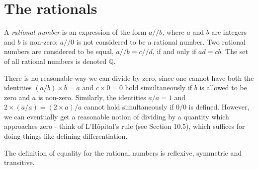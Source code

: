 \section{The rationals}

\begin{definition}\label{4.2.1}
A \emph{rational number} is an expression of the form \(a // b\), where \(a\) and \(b\) are integers and \(b\) is non-zero;
\(a // 0\) is not considered to be a rational number.
Two rational numbers are considered to be equal, \(a // b = c // d\), if and only if \(ad = cb\).
The set of all rational numbers is denoted \(\mathds{Q}\).
\end{definition}

\begin{note}
There is no reasonable way we can divide by zero, since one cannot have both the identities \((a / b) \times b = a\) and \(c \times 0 = 0\) hold simultaneously if \(b\) is allowed to be zero and \(a\) is non-zero.
Similarly, the identities \(a / a = 1\) and \(2 \times (a / a) = (2 \times a) / a\) cannot hold simultaneously if \(0 / 0\) is defined.
However, we can eventually get a reasonable notion of dividing by a quantity which approaches zero
- think of L'H\^opital's rule (see Section 10.5), which suffices for doing things like defining differentiation.
\end{note}

\begin{additional corollary}\label{ac 4.2.1}
The definition of equality for the rational numbers is reflexive, symmetric and transitive.
\end{additional corollary}

